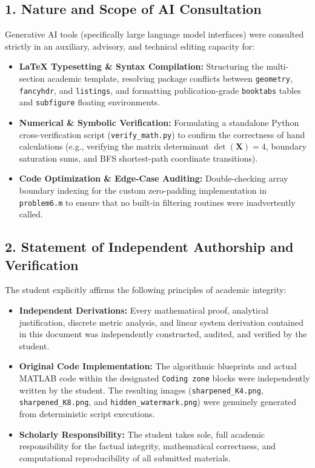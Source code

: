 \documentclass[11pt,a4paper]{article}
\begin{document}
\subsection*{1. Nature and Scope of AI Consultation}
Generative AI tools (specifically large language model interfaces) were consulted strictly in an auxiliary, advisory, and technical editing capacity for:
\begin{itemize}
    \item \textbf{\LaTeX{} Typesetting \& Syntax Compilation:} Structuring the multi-section academic template, resolving package conflicts between \texttt{geometry}, \texttt{fancyhdr}, and \texttt{listings}, and formatting publication-grade \texttt{booktabs} tables and \texttt{subfigure} floating environments.
    \item \textbf{Numerical \& Symbolic Verification:} Formulating a standalone Python cross-verification script (\texttt{verify\_math.py}) to confirm the correctness of hand calculations (e.g., verifying the matrix determinant $\det(\mathbf{X}) = 4$, boundary saturation sums, and BFS shortest-path coordinate transitions).
    \item \textbf{Code Optimization \& Edge-Case Auditing:} Double-checking array boundary indexing for the custom zero-padding implementation in \texttt{problem6.m} to ensure that no built-in filtering routines were inadvertently called.
\end{itemize}

\subsection*{2. Statement of Independent Authorship and Verification}
The student explicitly affirms the following principles of academic integrity:
\begin{itemize}
    \item \textbf{Independent Derivations:} Every mathematical proof, analytical justification, discrete metric analysis, and linear system derivation contained in this document was independently constructed, audited, and verified by the student.
    \item \textbf{Original Code Implementation:} The algorithmic blueprints and actual MATLAB code within the designated \texttt{Coding zone} blocks were independently written by the student. The resulting images (\texttt{sharpened\_K4.png}, \texttt{sharpened\_K8.png}, and \texttt{hidden\_watermark.png}) were genuinely generated from deterministic script executions.
    \item \textbf{Scholarly Responsibility:} The student takes sole, full academic responsibility for the factual integrity, mathematical correctness, and computational reproducibility of all submitted materials.
\end{itemize}
\end{document}
